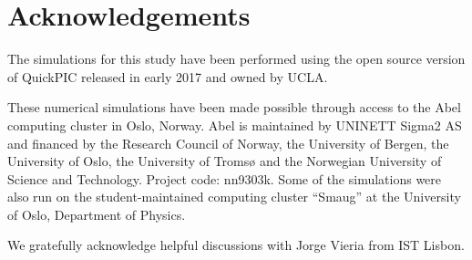 \documentclass[aps,prstab,reprint,amsmath,amssymb,groupedaddress,onecolumn]{revtex4-1}
\begin{document}
\section{Acknowledgements}\label{Ack}

The simulations for this study have been performed using the open source version of QuickPIC released in early 2017 and owned
by UCLA.

These numerical simulations have been made possible through access to the Abel computing cluster in Oslo, Norway. Abel
is maintained by UNINETT Sigma2 AS and financed by the Research Council of Norway, the University of Bergen, the
University of Oslo, the University of Troms{\o} and the Norwegian University of Science and Technology. Project code:
nn9303k. Some of the simulations were also run on the student-maintained computing cluster ``Smaug'' at the University
of Oslo, Department of Physics.

We gratefully acknowledge helpful discussions with Jorge Vieria from IST Lisbon. 


\end{document}
